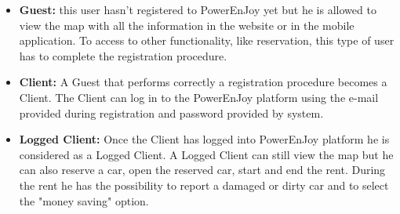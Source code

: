 \begin{itemize}
\item \textbf{Guest:} this user hasn't registered to PowerEnJoy yet but he is allowed to view the map with all the information in the website or in the mobile application. To access to other functionality, like reservation, this type of user has to complete the registration procedure.

\item \textbf{Client:} A Guest that performs correctly a registration procedure becomes a Client. The Client can log in to the PowerEnJoy platform using the e-mail provided during registration and password provided by system.

\item \textbf{Logged Client:} Once the Client has logged into PowerEnJoy platform he is considered as a Logged Client. A Logged Client can still view the map but he can also reserve a car, open the reserved car, start and end the rent. During the rent he has the possibility to report a damaged or dirty car and to select the "money saving" option. 
\end{itemize}